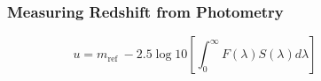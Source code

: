 \documentclass{beamer}
\begin{document}
\begin{frame}
    \begin{figure}
	\frametitle{Measuring Redshift from Photometry}
    \end{figure}
    \begin{equation}
        u=m_{\text {ref }}-2.5 \log {10}\left[\int_{0}^{\infty} F(\lambda) S(\lambda) d \lambda\right]
    \end{equation}
    \end{frame}
\end{document}
